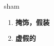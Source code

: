 
\begin{frame}
{\huge sham}
\begin{center}
\begin{enumerate}\Large
  \item \textbf{掩饰，假装}
  \item \textbf{虚假的}
\end{enumerate}
\end{center}
\end{frame}
